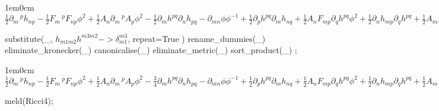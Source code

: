 \documentclass[12pt,a4paper,svgnames]{extarticle}
\begin{document}
\begin{adjustwidth}{1em}{0cm}${}\frac{1}{2}\partial_{m}\,^{p}{h_{n p}} - \frac{1}{2}F_{m}\,^{p} F_{n p} {\phi}^{2}+\frac{1}{2}A_{n} \partial_{m}\,^{p}{A_{p}} {\phi}^{2} - \frac{1}{2}\partial_{m}{h^{p q}} \partial_{n}{h_{p q}}-\partial_{m n}{\phi} {\phi}^{-1}+\frac{1}{2}\partial_{p}{h^{p q}} \partial_{m}{h_{n q}}+\frac{1}{2}A_{n} F_{m p} \partial_{q}{h^{p q}} {\phi}^{2}+\frac{1}{2}\partial_{n}{h_{m p}} \partial_{q}{h^{p q}}+\frac{1}{2}A_{m} F_{n p} \partial_{q}{h^{p q}} {\phi}^{2}+\frac{1}{2}\partial_{n}\,^{p}{h_{m p}}+\frac{1}{2}A_{m} \partial_{n}\,^{p}{A_{p}} {\phi}^{2} - \frac{1}{2}\partial_{p}{h_{m n}} \partial_{q}{h^{p q}}-A_{m} A_{n} \partial_{p}{\phi} \partial_{q}{h^{p q}} \phi - \frac{1}{2}\partial^{p}\,_{p}{h_{m n}}-A_{m} A_{n} \partial^{p}\,_{p}{\phi} \phi - \frac{1}{2}A_{n} \partial^{p}\,_{p}{A_{m}} {\phi}^{2} - \frac{1}{2}A_{m} \partial^{p}\,_{p}{A_{n}} {\phi}^{2} - \frac{1}{2}\partial^{p}{h_{m}\,^{r}} \partial_{r}{h_{n p}}+\frac{1}{2}A_{n} F^{p r} \partial_{p}{h_{m r}} {\phi}^{2}%
+\frac{1}{2}A_{m} F^{p r} \partial_{p}{h_{n r}} {\phi}^{2}+\frac{1}{4}A_{m} A_{n} F^{p r} F_{p r} {\phi}^{4}+\frac{1}{2}\partial^{p}{h_{m}\,^{r}} \partial_{p}{h_{n r}} - \frac{1}{4}\partial_{m}{h^{p r}} \partial_{n}{h_{p r}}+\frac{1}{2}\partial^{p}{\phi} \partial_{m}{h_{n p}} {\phi}^{-1}+\frac{1}{2}\partial^{p}{\phi} \partial_{n}{h_{m p}} {\phi}^{-1} - \frac{1}{2}\partial^{p}{\phi} \partial_{p}{h_{m n}} {\phi}^{-1}$\end{adjustwidth}
\begin{python}
substitute(_, $h_{m1 m2} h^{m3 m2} -> \delta_{m1}^{m3}$, repeat=True )
rename_dummies(_)
eliminate_kronecker(_)
canonicalise(_)
eliminate_metric(_)
sort_product(_)
;
\end{python}
\begin{adjustwidth}{1em}{0cm}${}\frac{1}{2}\partial_{m}\,^{p}{h_{n p}} - \frac{1}{2}F_{m}\,^{p} F_{n p} {\phi}^{2}+\frac{1}{2}A_{n} \partial_{m}\,^{p}{A_{p}} {\phi}^{2} - \frac{3}{4}\partial_{m}{h^{p q}} \partial_{n}{h_{p q}}-\partial_{m n}{\phi} {\phi}^{-1}+\frac{1}{2}\partial_{p}{h^{p q}} \partial_{m}{h_{n q}}+\frac{1}{2}A_{n} F_{m p} \partial_{q}{h^{p q}} {\phi}^{2}+\frac{1}{2}\partial_{n}{h_{m p}} \partial_{q}{h^{p q}}+\frac{1}{2}A_{m} F_{n p} \partial_{q}{h^{p q}} {\phi}^{2}+\frac{1}{2}\partial_{n}\,^{p}{h_{m p}}+\frac{1}{2}A_{m} \partial_{n}\,^{p}{A_{p}} {\phi}^{2} - \frac{1}{2}\partial_{p}{h_{m n}} \partial_{q}{h^{p q}}-A_{m} A_{n} \partial_{p}{\phi} \partial_{q}{h^{p q}} \phi - \frac{1}{2}\partial^{p}\,_{p}{h_{m n}}-A_{m} A_{n} \partial^{p}\,_{p}{\phi} \phi - \frac{1}{2}A_{n} \partial^{p}\,_{p}{A_{m}} {\phi}^{2} - \frac{1}{2}A_{m} \partial^{p}\,_{p}{A_{n}} {\phi}^{2} - \frac{1}{2}\partial^{p}{h_{m}\,^{q}} \partial_{q}{h_{n p}}+\frac{1}{2}A_{n} F^{p q} \partial_{p}{h_{m q}} {\phi}^{2}%
+\frac{1}{2}A_{m} F^{p q} \partial_{p}{h_{n q}} {\phi}^{2}+\frac{1}{4}A_{m} A_{n} F^{p q} F_{p q} {\phi}^{4}+\frac{1}{2}\partial^{p}{h_{m}\,^{q}} \partial_{p}{h_{n q}}+\frac{1}{2}\partial^{p}{\phi} \partial_{m}{h_{n p}} {\phi}^{-1}+\frac{1}{2}\partial^{p}{\phi} \partial_{n}{h_{m p}} {\phi}^{-1} - \frac{1}{2}\partial^{p}{\phi} \partial_{p}{h_{m n}} {\phi}^{-1}$\end{adjustwidth}
\begin{python}
meld(Ricci4);
\end{python}
{\color{red}{RuntimeError: Could not find a suitable element to add to the matrix

At:
  <string>(2): <module>
}}
\begin{python}
\end{python}
\end{document}
